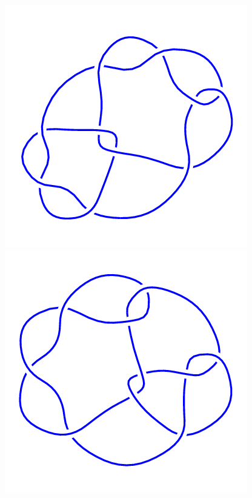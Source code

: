 \begin{figure}[H]
\begin{minipage}[b]{.18\linewidth}
	\end{minipage}
	\begin{minipage}[b]{.18\linewidth}
		\centering
		\includegraphics[width=\linewidth]{../data/10_54.png}
	\end{minipage}
	\begin{minipage}[b]{.18\linewidth}
		\centering
		\includegraphics[width=\linewidth]{../data/10_55.png}

\end{minipage}
\end{figure}
